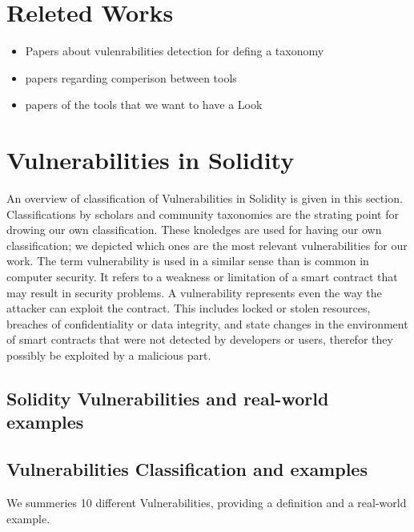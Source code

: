 \documentclass[a4paper,sigconf, language=french,
language=german, language=spanish, language=english]{acmart}
\begin{document}
\section{Releted Works}
\label{RelatedWorks}
\begin{itemize}
  \item Papers about vulenrabilities detection for defing a taxonomy
  \item papers regarding comperison between tools
  \item papers of the tools that we want to have a Look
\end{itemize}

\citet{SystematicReviewVuln} 

\section{Vulnerabilities in Solidity}
\label{Vulnerabilities}
An overview of classification of Vulnerabilities in Solidity is given in this section. 
Classifications by scholars and community taxonomies are the strating point for drowing our own classification. 
These knoledges are used for having our own classification; we depicted which ones are the most relevant 
vulnerabilities for our work.
The term vulnerability is used in a similar sense than is common in computer security. 
It refers to a weakness or limitation of a smart contract that may result in
security problems. 
A vulnerability represents even the way the attacker can exploit the contract. 
This includes locked or stolen
resources, breaches of confidentiality or data integrity, and state
changes in the environment of smart contracts that were not
detected by developers or users, therefor they possibly be exploited by a malicious part.
\subsection{Solidity Vulnerabilities and real-world examples}
\label{sec:Vulenerabilities:Definifinition}

\subsection{Vulnerabilities Classification and examples}
\label{sec:Vulnerabilities:Classification}
We summeries 10 different Vulnerabilities, providing a definition and a real-world example.
\end{document}
